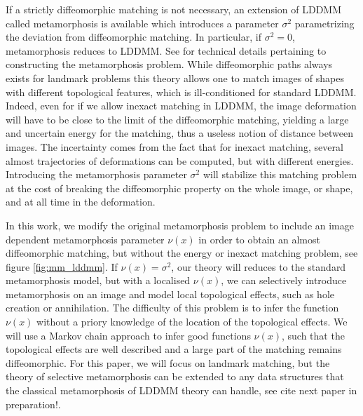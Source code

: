 \documentclass[runningheads]{llncs}
\begin{document}
If a strictly diffeomorphic matching is not necessary, an extension of LDDMM
called metamorphosis \cite{trouve2005metamorphoses,holm2009euler} is available
which introduces a parameter $\sigma^2$ parametrizing the deviation from
diffeomorphic matching.  In particular, if $\sigma^2=0$, metamorphosis reduces
to LDDMM.  See \cite{trouve1995infinite,trouve2005local,miller2001group} for
technical details pertaining to constructing the metamorphosis problem.  While
diffeomorphic paths always exists for landmark problems
\cite{guo2006diffeomorphic} this theory allows one to match images of shapes
with different topological features, which is ill-conditioned for standard
LDDMM. Indeed, even for if we allow inexact matching in LDDMM, the image
deformation will have to be close to the limit of the diffeomorphic matching,
yielding a large and uncertain energy for the matching, thus a useless notion of
distance between images. The incertainty comes from the fact that for inexact
matching, several almost trajectories of deformations can be computed, but with
different energies.  Introducing the metamorphosis parameter $\sigma^2$ will
stabilize this matching problem at the cost of breaking the diffeomorphic
property on the whole image, or shape, and at all time in the deformation. 

In this work, we modify the original metamorphosis problem to include an image
dependent metamorphosis parameter $\nu(x)$ in order to obtain an almost
diffeomorphic matching, but without the energy or inexact matching problem, see
figure \ref{fig:mm_lddmm}.  If $\nu(x) = \sigma^2$, our theory will reduces to
the standard metamorphosis model, but with a localised $\nu(x)$, we can
selectively introduce metamorphosis on an image and model local topological
effects, such as hole creation or annihilation.  The difficulty of this problem
is to infer the function $\nu(x)$ without a priory knowledge of the location of
the topological effects.  We will use a Markov chain approach to infer good
functions $\nu(x)$, such that the topological effects are well described and a
large part of the matching remains diffeomorphic.  For this paper, we will focus
on landmark matching, but the theory of selective metamorphosis can be extended
to any data structures that the classical metamorphosis of LDDMM theory can
handle, see {\color{red} cite next paper in preparation!}. 
\end{document}
